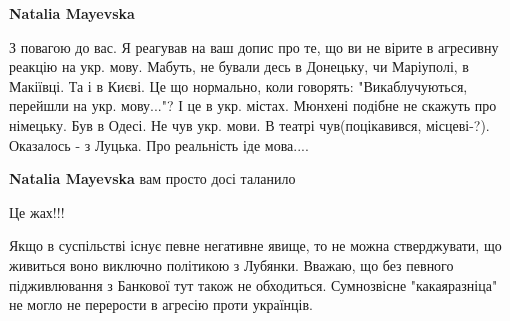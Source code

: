 \begin{itemize}
\begin{itemize}
 
\textbf{Natalia Mayevska} 

З повагою до вас. Я реагував на ваш допис про те, що ви не вірите в агресивну
реакцію на укр. мову. Мабуть, не бували десь в Донецьку, чи Маріуполі, в Макіївці. Та
і в Києві. Це що нормально, коли говорять: "Викаблучуються, перейшли на
укр. мову..."? І це в укр. містах. Мюнхені подібне не скажуть про німецьку. Був в
Одесі. Не чув укр. мови. В театрі чув(поцікавився, місцеві-?). Оказалось - з
Луцька. Про реальність іде мова....


 
\textbf{Natalia Mayevska} вам просто досі таланило

\end{itemize}

 
Це жах!!!

 

Якщо в суспільстві існує певне негативне явище, то не можна стверджувати, що
живиться воно виключно політикою з Лубянки. Вважаю, що без певного
підживлювання з Банкової тут також не обходиться. Сумнозвісне "какаяразніца" не
могло не перерости в агресію проти українців.


 


\end{itemize}
